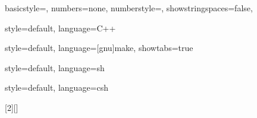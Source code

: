 

\renewcommand{\sectionautorefname}{Section}
\renewcommand{\subsectionautorefname}{Subsection}

\newcommand{\BlankLine}{\vspace{1.5ex} \noindent}
\newcommand{\Code}[1]{\texttt{#1}}
\newcommand{\Symbol}[1]{\textsl{#1}}
\newcommand{\Makexp}[1]{\texttt{\$(#1)}}




{
  basicstyle=\ttfamily, numbers=none, numberstyle=\tiny,%
  showstringspaces=false,
}

{
  style=default, language=C++
}

{
  style=default, language=[gnu]make, showtabs=true
}

{
  style=default, language=sh
}

{
  style=default, language=csh
}

[2][]
{
  \lstset{style=#2, xleftmargin=5mm, gobble=2, #1}
}
{}

\newcommand{\IncludeSource}[3][]
{
  
}




\newlength{\DescrLength}

\newcommand{\DescrFormat}[1]{#1}

\newcommand{\DescrLabel}[1]
{%
  \settowidth{\DescrLength}{\DescrFormat{#1}}%
  \ifthenelse{\lengthtest{\DescrLength > \labelwidth}}%
  {%
    \parbox[b]{\labelwidth}%
    {%
      \makebox[0pt][l]{\DescrFormat{#1}}\\\mbox{}%
    }%
  }{%
    {\DescrFormat{#1}}%
  }%
  \hfil\relax
  \refstepcounter{DescrCounter}
}


\newenvironment{Description}[1][\textnormal]
{
  \begin{list}{h}
  {
    \renewcommand{\DescrFormat}{#1}
    \renewcommand{\makelabel}{\DescrLabel}
    \setlength{\labelwidth}{30pt}
    \setlength{\itemindent}{0pt}
    \setlength{\leftmargin}{\labelwidth + \labelsep + \labelsep}
    \setlength{\rightmargin}{0pt}
  }
}
{ \end{list} }


